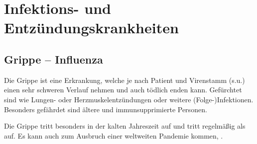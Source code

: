 




\clearpage

\section{Infektions- und Entzündungskrankheiten}


\subsection{Grippe -- Influenza}
\label{topic:grippe}


{
Die Grippe ist eine  Erkrankung, welche je nach
Patient und Virenstamm (s.u.) einen sehr schweren
Verlauf nehmen und auch tödlich enden kann. Gefürchtet sind
 wie Lungen- oder
Herzmuskelentzündungen oder weitere (Folge-)Infektionen.
Besonders gefährdet sind ältere und immunsupprimierte Personen.
}{}{}{}{}



Die Grippe tritt besonders in der kalten Jahreszeit auf und tritt
regelmäßig als  auf. Es
kann auch zum Ausbruch einer weltweiten Pandemie kommen, .

